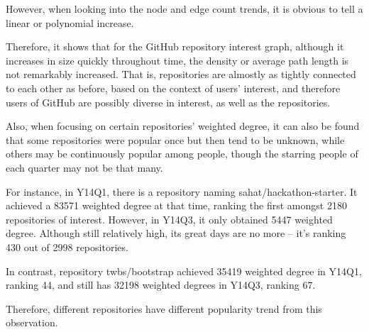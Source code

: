 \documentclass[11pt]{article}
\begin{document}
However, when looking into the node and edge count trends, it is obvious to tell a linear or polynomial increase.

Therefore, it shows that for the GitHub repository interest graph, although it increases in size quickly throughout time, the density or average path length is not remarkably increased. That is, repositories are almostly as tightly connected to each other as before, based on the context of users' interest, and therefore users of GitHub are possibly diverse in interest, as well as the repositories.

Also, when focusing on certain repositories' weighted degree, it can also be found that some repositories were popular once but then tend to be unknown, while others may be continuously popular among people, though the starring people of each quarter may not be that many.

For instance, in Y14Q1, there is a repository naming sahat/hackathon-starter. It achieved a 83571 weighted degree at that time, ranking the first amongst 2180 repositories of interest. However, in Y14Q3, it only obtained 5447 weighted degree. Although still relatively high, its great days are no more -- it's ranking 430 out of 2998 repositories.

In contrast, repository twbs/bootstrap achieved 35419 weighted degree in Y14Q1, ranking 44, and still has 32198 weighted degrees in Y14Q3, ranking 67.

Therefore, different repositories have different popularity trend from this observation.
\end{document}

